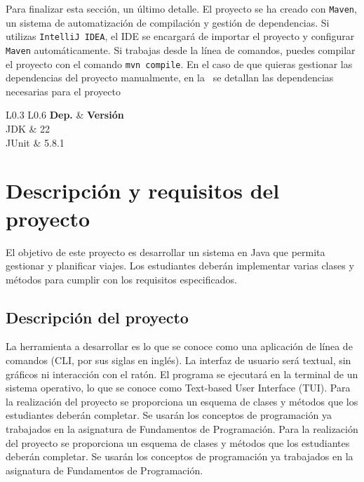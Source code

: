 \documentclass[
    a4paper, %
    12pt, %
]{CSSullivanBusinessReport}
\begin{document}
Para finalizar esta sección, un último detalle. El proyecto se ha creado con \texttt{Maven}, un sistema de automatización de compilación y gestión de dependencias. Si utilizas \texttt{IntelliJ IDEA}, el IDE se encargará de importar el proyecto y configurar \texttt{Maven} automáticamente. Si trabajas desde la línea de comandos, puedes compilar el proyecto con el comando \texttt{mvn compile}. En el caso de que quieras gestionar las dependencias del proyecto manualmente, en la~ se detallan las dependencias necesarias para el proyecto
\begin{margintable}
	\footnotesize
	\caption{Dependencias del proyecto.}\label{tab:dependencias-proyecto}
	\begin{tabular}{L{0.3\linewidth} L{0.6\linewidth}}
		\toprule
		\textbf{Dep.} & \textbf{Versión} \\
		\midrule
		JDK & 22\\
		JUnit & 5.8.1\\
		\bottomrule
	\end{tabular}
\end{margintable}
\section{Descripción y requisitos del proyecto}
El objetivo de este proyecto es desarrollar un sistema en Java que permita gestionar y planificar viajes. Los estudiantes deberán implementar varias clases y métodos para cumplir con los requisitos especificados.


\subsection{Descripción del proyecto}
La herramienta a desarrollar es lo que se conoce como una aplicación de línea de comandos (CLI, por sus siglas en inglés). La interfaz de usuario será textual, sin gráficos ni interacción con el ratón. El programa se ejecutará en la terminal de un sistema operativo, lo que se conoce como Text-based User Interface (TUI). Para la realización del proyecto se proporciona un esquema de clases y métodos que los estudiantes deberán completar. Se usarán los conceptos de programación ya trabajados en la asignatura de Fundamentos de Programación. Para la realización del proyecto se proporciona un esquema de clases y métodos que los estudiantes deberán completar. Se usarán los conceptos de programación ya trabajados en la asignatura de Fundamentos de Programación.
\end{document}

